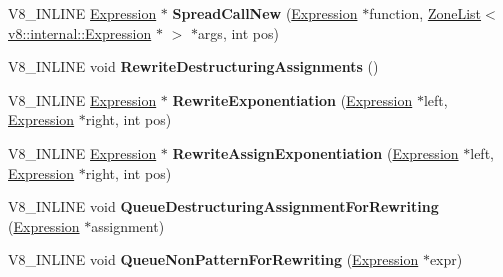 \begin{DoxyCompactItemize}
\item 
V8\+\_\+\+I\+N\+L\+I\+NE \hyperlink{classv8_1_1internal_1_1_expression}{Expression} $\ast$ {\bfseries Spread\+Call\+New} (\hyperlink{classv8_1_1internal_1_1_expression}{Expression} $\ast$function, \hyperlink{classv8_1_1internal_1_1_zone_list}{Zone\+List}$<$ \hyperlink{classv8_1_1internal_1_1_expression}{v8\+::internal\+::\+Expression} $\ast$ $>$ $\ast$args, int pos)\hypertarget{classv8_1_1internal_1_1_parser_traits_aa6324e3aca79dabaf58d37160791585e}{}\label{classv8_1_1internal_1_1_parser_traits_aa6324e3aca79dabaf58d37160791585e}

\item 
V8\+\_\+\+I\+N\+L\+I\+NE void {\bfseries Rewrite\+Destructuring\+Assignments} ()\hypertarget{classv8_1_1internal_1_1_parser_traits_ab539b32dd1a936be8829563a36c96e0a}{}\label{classv8_1_1internal_1_1_parser_traits_ab539b32dd1a936be8829563a36c96e0a}

\item 
V8\+\_\+\+I\+N\+L\+I\+NE \hyperlink{classv8_1_1internal_1_1_expression}{Expression} $\ast$ {\bfseries Rewrite\+Exponentiation} (\hyperlink{classv8_1_1internal_1_1_expression}{Expression} $\ast$left, \hyperlink{classv8_1_1internal_1_1_expression}{Expression} $\ast$right, int pos)\hypertarget{classv8_1_1internal_1_1_parser_traits_a4cc3350478f26ad5f7d9f26183d88a29}{}\label{classv8_1_1internal_1_1_parser_traits_a4cc3350478f26ad5f7d9f26183d88a29}

\item 
V8\+\_\+\+I\+N\+L\+I\+NE \hyperlink{classv8_1_1internal_1_1_expression}{Expression} $\ast$ {\bfseries Rewrite\+Assign\+Exponentiation} (\hyperlink{classv8_1_1internal_1_1_expression}{Expression} $\ast$left, \hyperlink{classv8_1_1internal_1_1_expression}{Expression} $\ast$right, int pos)\hypertarget{classv8_1_1internal_1_1_parser_traits_aa3fa3303f302eebd12719ccc73d05bfe}{}\label{classv8_1_1internal_1_1_parser_traits_aa3fa3303f302eebd12719ccc73d05bfe}

\item 
V8\+\_\+\+I\+N\+L\+I\+NE void {\bfseries Queue\+Destructuring\+Assignment\+For\+Rewriting} (\hyperlink{classv8_1_1internal_1_1_expression}{Expression} $\ast$assignment)\hypertarget{classv8_1_1internal_1_1_parser_traits_a6c39e29ba81a6d71bdc6db82499fc8ae}{}\label{classv8_1_1internal_1_1_parser_traits_a6c39e29ba81a6d71bdc6db82499fc8ae}

\item 
V8\+\_\+\+I\+N\+L\+I\+NE void {\bfseries Queue\+Non\+Pattern\+For\+Rewriting} (\hyperlink{classv8_1_1internal_1_1_expression}{Expression} $\ast$expr)\hypertarget{classv8_1_1internal_1_1_parser_traits_a07a4e3e2033b09e354dfd8d2c4133d51}{}\label{classv8_1_1internal_1_1_parser_traits_a07a4e3e2033b09e354dfd8d2c4133d51}


\end{DoxyCompactItemize}
